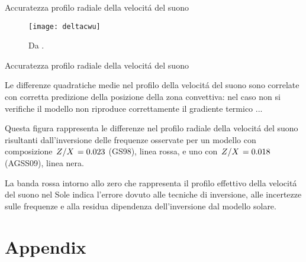 \documentclass[10pt,xcolor={usenames},fleqn,mathserif,serif]{beamer}
\begin{document}
\begin{frame}{Accuratezza profilo radiale della velocit\'a del suono}

\begin{figure}[!ht]%
        \texttt{[image: deltacwu]}
        \caption{Da \cite{villante2014chemical}.}\label{fig:deltacwu}
\end{figure}

\end{frame}

\begin{wordonframe}{Accuratezza profilo radiale della velocit\'a del suono}

Le differenze quadratiche medie nel profilo della velocit\'a del suono sono  correlate con corretta predizione della posizione della zona convettiva: nel caso non si verifiche il modello non riproduce correttamente il gradiente termico ...

Questa figura rappresenta le differenze nel profilo radiale della velocit\'a del suono risultanti dall'inversione delle frequenze osservate per un modello con composizione $\left.{Z}\middle/{X}\right.=0.023$ (GS98), linea rossa, e uno con $\left.{Z}\middle/{X}\right.=0.018$ (AGSS09), linea nera.

La banda rossa intorno allo zero che rappresenta il profilo effettivo della velocit\'a del suono nel Sole indica l'errore dovuto alle tecniche di inversione, alle incertezze sulle frequenze e alla residua dipendenza dell'inversione dal modello solare.

\end{wordonframe}

\section{Appendix}
\end{document}
